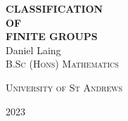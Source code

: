 \begin{titlepage}
\centering
\vspace*{0.12\textheight}
{\bfseries\Huge CLASSIFICATION}\\[\baselineskip]
{\bfseries\Large OF}\\[\baselineskip]
{\bfseries\Huge FINITE GROUPS}\\[\baselineskip]
{\large Daniel Laing}\\[\baselineskip]
\vfill\null%
{\small\scshape B.Sc (Hons) Mathematics}\par
{\small\scshape University of St Andrews}\par
{\small\scshape 2023}\par
\end{titlepage}
